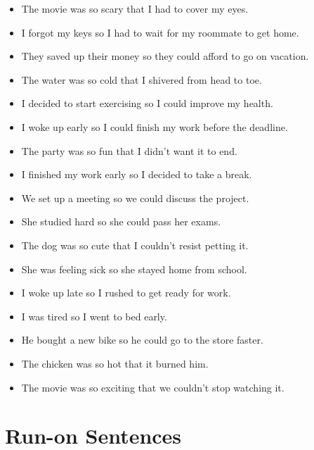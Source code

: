 \documentclass[letterpaper, 17pt]{article}
\begin{document}
\begin{itemize}
	\item The movie was so scary that I had to cover my eyes.	%
	\item I forgot my keys so I had to wait for my roommate to get home.	%
	\item They saved up their money so they could afford to go on vacation.	%
	\item The water was so cold that I shivered from head to toe.	%
	\item I decided to start exercising so I could improve my health.	%
	\item I woke up early so I could finish my work before the deadline.	%
	\item The party was so fun that I didn't want it to end.	%
	\item I finished my work early so I decided to take a break.	%
	\item We set up a meeting so we could discuss the project.	%
	\item She studied hard so she could pass her exams.	%
	\item The dog was so cute that I couldn't resist petting it.	%
	\item She was feeling sick so she stayed home from school.	%
	\item I woke up late so I rushed to get ready for work.	%
	\item I was tired so I went to bed early.	%
	\item He bought a new bike so he could go to the store faster.	%
	\item The chicken was so hot that it burned him.	%
	\item The movie was so exciting that we couldn't stop watching it.	%
\end{itemize}

\newpage
\section*{Run-on Sentences}
\end{document}
